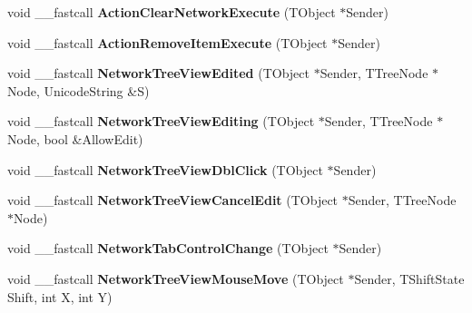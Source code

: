 \begin{DoxyCompactItemize}
\item 
\hypertarget{class_t_network_g_u_i_a660b34dd04a94b970a54bc9964ce3de8}{void \+\_\+\+\_\+fastcall {\bfseries Action\+Clear\+Network\+Execute} (T\+Object $\ast$Sender)}\label{class_t_network_g_u_i_a660b34dd04a94b970a54bc9964ce3de8}

\item 
\hypertarget{class_t_network_g_u_i_a7fe607193edb8ea0998adea49e314105}{void \+\_\+\+\_\+fastcall {\bfseries Action\+Remove\+Item\+Execute} (T\+Object $\ast$Sender)}\label{class_t_network_g_u_i_a7fe607193edb8ea0998adea49e314105}

\item 
\hypertarget{class_t_network_g_u_i_a63ebdd566386839f24347e18fa1decff}{void \+\_\+\+\_\+fastcall {\bfseries Network\+Tree\+View\+Edited} (T\+Object $\ast$Sender, T\+Tree\+Node $\ast$Node, Unicode\+String \&S)}\label{class_t_network_g_u_i_a63ebdd566386839f24347e18fa1decff}

\item 
\hypertarget{class_t_network_g_u_i_ad331603fe44bc47f68dac7df6cb56d3b}{void \+\_\+\+\_\+fastcall {\bfseries Network\+Tree\+View\+Editing} (T\+Object $\ast$Sender, T\+Tree\+Node $\ast$Node, bool \&Allow\+Edit)}\label{class_t_network_g_u_i_ad331603fe44bc47f68dac7df6cb56d3b}

\item 
\hypertarget{class_t_network_g_u_i_a76040e51bed8abf863018d30b6b9efb5}{void \+\_\+\+\_\+fastcall {\bfseries Network\+Tree\+View\+Dbl\+Click} (T\+Object $\ast$Sender)}\label{class_t_network_g_u_i_a76040e51bed8abf863018d30b6b9efb5}

\item 
\hypertarget{class_t_network_g_u_i_ae1598e335b16b4e708be702df0c239a3}{void \+\_\+\+\_\+fastcall {\bfseries Network\+Tree\+View\+Cancel\+Edit} (T\+Object $\ast$Sender, T\+Tree\+Node $\ast$Node)}\label{class_t_network_g_u_i_ae1598e335b16b4e708be702df0c239a3}

\item 
\hypertarget{class_t_network_g_u_i_a68da4c44df9e4f610d2cee97932d7f32}{void \+\_\+\+\_\+fastcall {\bfseries Network\+Tab\+Control\+Change} (T\+Object $\ast$Sender)}\label{class_t_network_g_u_i_a68da4c44df9e4f610d2cee97932d7f32}

\item 
\hypertarget{class_t_network_g_u_i_ad1f7b679669b5596faa4f54839d791c9}{void \+\_\+\+\_\+fastcall {\bfseries Network\+Tree\+View\+Mouse\+Move} (T\+Object $\ast$Sender, T\+Shift\+State Shift, int X, int Y)}\label{class_t_network_g_u_i_ad1f7b679669b5596faa4f54839d791c9}


\end{DoxyCompactItemize}
